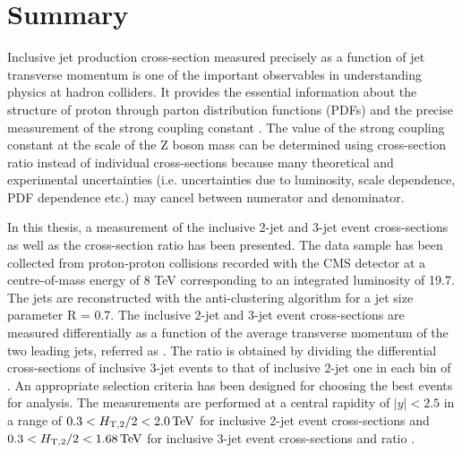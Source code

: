 \chapter{Summary}
\label{chap:Summary}
Inclusive jet production cross-section measured precisely as a function of jet transverse momentum is one of the important observables in understanding physics at hadron colliders. It provides the essential information about the structure of proton through parton distribution functions (PDFs) and the precise measurement of the strong coupling constant \alps. The value of the strong coupling constant at the scale of the Z boson mass \alpsmz can be determined using cross-section ratio instead of individual cross-sections because many theoretical and experimental uncertainties (i.e. uncertainties due to luminosity, scale dependence, PDF dependence etc.) may cancel between numerator and denominator.

In this thesis, a measurement of the inclusive 2-jet and 3-jet event cross-sections as well as the cross-section ratio \ratio has been presented. The data sample has been collected from proton-proton collisions recorded with the CMS detector at a centre-of-mass energy of 8 TeV corresponding to an integrated luminosity of 19.7\fbinv. The jets are reconstructed with the anti-\kt clustering algorithm for a jet size parameter R = 0.7. The inclusive 2-jet and 3-jet event cross-sections are measured differentially as a function of the average transverse momentum of the two leading jets, referred as \httwo. The ratio \ratio is obtained by dividing the differential cross-sections of inclusive 3-jet events to that of inclusive 2-jet one in each bin of \httwo. An appropriate selection criteria has been designed for choosing the best
events for analysis. The measurements are performed at a central rapidity of $|y|<2.5$ in a range of $0.3 < H_{\mathrm{T,2}}/2 < 2.0\,\text{Te\hspace{-.08em}V}$ for inclusive 2-jet event cross-sections and $0.3 < H_{\mathrm{T,2}}/2 < 1.68\,\text{Te\hspace{-.08em}V}$ for inclusive 3-jet event cross-sections and ratio \ratio. 

